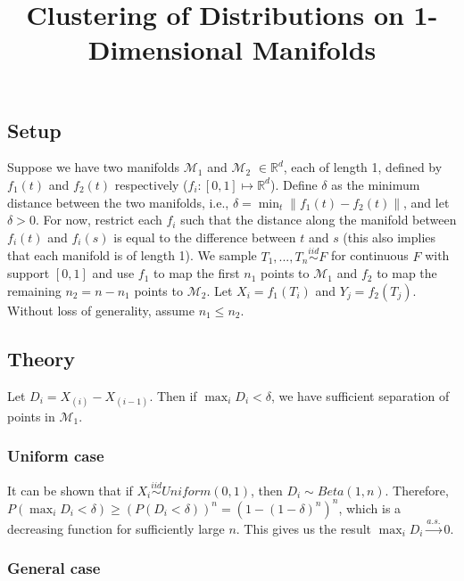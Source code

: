 \documentclass[
  11pt,
]{article}
\title{Clustering of Distributions on 1-Dimensional Manifolds}
\author{}
\date{\vspace{-2.5em}}
\begin{document}
\maketitle

\hypertarget{setup}{%
\subsection{Setup}\label{setup}}

Suppose we have two manifolds \(\mathcal{M}_1\) and \(\mathcal{M}_2\)
\(\in \mathbb{R}^d\), each of length 1, defined by \(f_1(t)\) and
\(f_2(t)\) respectively (\(f_i : [0, 1] \mapsto \mathbb{R}^d\)). Define
\(\delta\) as the minimum distance between the two manifolds, i.e.,
\(\delta = \min_t \|f_1(t) - f_2(t)\|\), and let \(\delta > 0\). For
now, restrict each \(f_i\) such that the distance along the manifold
between \(f_i(t)\) and \(f_i(s)\) is equal to the difference between
\(t\) and \(s\) (this also implies that each manifold is of length 1).
We sample \(T_1, ..., T_n \stackrel{iid}{\sim} F\) for continuous \(F\)
with support \([0, 1]\) and use \(f_1\) to map the first \(n_1\) points
to \(\mathcal{M}_1\) and \(f_2\) to map the remaining \(n_2 = n - n_1\)
points to \(\mathcal{M}_2\). Let \(X_i = f_1(T_i)\) and
\(Y_j = f_2(T_j)\). Without loss of generality, assume \(n_1 \leq n_2\).

\hypertarget{theory}{%
\subsection{Theory}\label{theory}}

Let \(D_i = X_{(i)} - X_{(i-1)}\). Then if \(\max_i D_i < \delta\), we
have sufficient separation of points in \(\mathcal{M}_1\).

\hypertarget{uniform-case}{%
\subsubsection{Uniform case}\label{uniform-case}}

It can be shown that if \(X_i \stackrel{iid}{\sim} Uniform(0, 1)\), then
\(D_i \sim Beta(1, n)\). Therefore,
\(P(\max_i D_i < \delta) \geq (P(D_i < \delta))^n = (1 - (1 - \delta)^n)^n\),
which is a decreasing function for sufficiently large \(n\). This gives
us the result \(\max_i D_i \stackrel{a.s.}{\to} 0\).

\hypertarget{general-case}{%
\subsubsection{General case}\label{general-case}}
\end{document}
